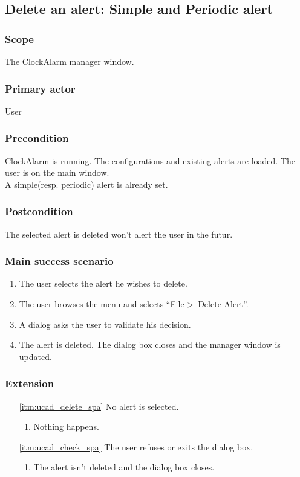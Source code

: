 \subsection{Delete an alert: Simple and Periodic alert}\label{subsec:usecase_delete_simple_alert}

\subsubsection{Scope}
The ClockAlarm manager window.
\subsubsection{Primary actor}
User
\subsubsection{Precondition}
ClockAlarm is running. The configurations and existing alerts are loaded. The user is on the main window.
\\A simple(resp. periodic) alert is already set.
\subsubsection{Postcondition}
The selected alert is deleted won't alert the user in the futur.
\subsubsection{Main success scenario}
\begin{enumerate}
	\item The user selects the alert he wishes to delete.
	\item \label{itm:ucad_delete_spa} The user browses the menu and selects ``File \textgreater~Delete Alert''.
	\item \label{itm:ucad_check_spa} A dialog asks the user to validate his decision.
	\item The alert is deleted. The dialog box closes and the manager window is updated.
\end{enumerate}
\subsubsection{Extension}
\begin{enumerate}
	\item[\ref{itm:ucad_delete_spa}] No alert is selected.
	\begin{enumerate}[i]
		\item Nothing happens.
	\end{enumerate}
	
	\item[\ref{itm:ucad_check_spa}] The user refuses or exits the dialog box.
	\begin{enumerate}[i]
		\item The alert isn't deleted and the dialog box closes.
	\end{enumerate}
\end{enumerate}

